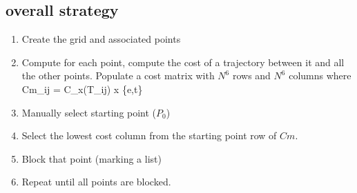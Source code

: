 \documentclass[letterpaper]{article}
\begin{document}
\subsection{overall strategy}

\begin{enumerate}
  \item Create the grid and associated points
  \item Compute for each point, compute the cost of a trajectory between it and all the other points.  Populate
  a cost matrix with $N^6$ rows and $N^6$ columns where
  \beq
    Cm_{ij} = C_x(T_{ij})  \qquad    x \in \{e,t\}
  \eeq
  \item Manually select starting point ($P_0$)
  \item Select the lowest cost column from the starting point row of $Cm$.
  \item Block that point (marking a list)
  \item Repeat until all points are blocked.
\end{enumerate}
\end{document}
